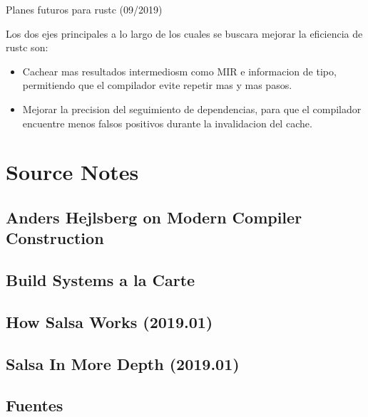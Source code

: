 \documentclass[12pt, a4paper]{report}
\begin{document}
  Planes futuros para rustc (09/2019)

  Los dos ejes principales a lo largo de los cuales se buscara mejorar la eficiencia de rustc son:
  \begin{itemize}[noitemsep]
  \item Cachear mas resultados intermediosm como MIR e informacion de tipo, permitiendo que el compilador evite repetir mas y mas pasos.
  \item Mejorar la precision del seguimiento de dependencias, para que el compilador encuentre menos falsos positivos durante la invalidacion del cache.
  \end{itemize}
  \cite{rust_blog_incremental_compilation}

\chapter*{Source Notes}

  \section*{Anders Hejlsberg on Modern Compiler Construction}
  \cite{hejlsberg_modern_compiler_construction}

  \section*{Build Systems a la Carte}
  \cite{mokhov2018build}

  \section*{How Salsa Works (2019.01)}
  \cite{niko2019salsaworks}

  \section*{Salsa In More Depth (2019.01)}
  \cite{niko2019salsadepth}

  \section*{Fuentes}
\end{document}
